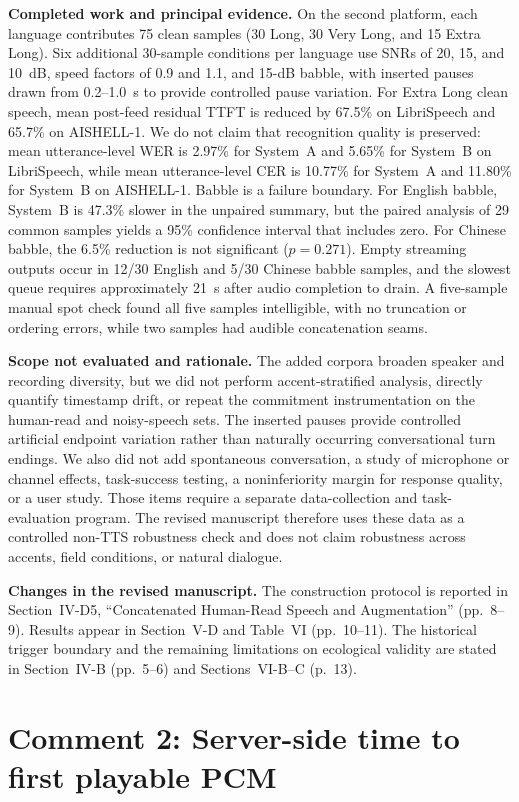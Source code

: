 \documentclass[11pt]{article}
\newcommand{\completed}{\vspace{0.25em}\noindent\textbf{Completed work and principal evidence.} }
\newcommand{\scope}{\vspace{0.25em}\noindent\textbf{Scope not evaluated and rationale.} }
\newcommand{\changes}{\vspace{0.25em}\noindent\textbf{Changes in the revised manuscript.} }
\begin{document}
\completed On the second platform, each language contributes 75 clean samples (30 Long, 30 Very Long, and 15 Extra Long). Six additional 30-sample conditions per language use SNRs of 20, 15, and 10~dB, speed factors of 0.9 and 1.1, and 15-dB babble, with inserted pauses drawn from 0.2--1.0~s to provide controlled pause variation. For Extra Long clean speech, mean post-feed residual TTFT is reduced by 67.5\% on LibriSpeech and 65.7\% on AISHELL-1. We do not claim that recognition quality is preserved: mean utterance-level WER is 2.97\% for System~A and 5.65\% for System~B on LibriSpeech, while mean utterance-level CER is 10.77\% for System~A and 11.80\% for System~B on AISHELL-1. Babble is a failure boundary. For English babble, System~B is 47.3\% slower in the unpaired summary, but the paired analysis of 29 common samples yields a 95\% confidence interval that includes zero. For Chinese babble, the 6.5\% reduction is not significant ($p=0.271$). Empty streaming outputs occur in 12/30 English and 5/30 Chinese babble samples, and the slowest queue requires approximately 21~s after audio completion to drain. A five-sample manual spot check found all five samples intelligible, with no truncation or ordering errors, while two samples had audible concatenation seams.

\scope The added corpora broaden speaker and recording diversity, but we did not perform accent-stratified analysis, directly quantify timestamp drift, or repeat the commitment instrumentation on the human-read and noisy-speech sets. The inserted pauses provide controlled artificial endpoint variation rather than naturally occurring conversational turn endings. We also did not add spontaneous conversation, a study of microphone or channel effects, task-success testing, a noninferiority margin for response quality, or a user study. Those items require a separate data-collection and task-evaluation program. The revised manuscript therefore uses these data as a controlled non-TTS robustness check and does not claim robustness across accents, field conditions, or natural dialogue.

\changes The construction protocol is reported in Section~IV-D5, ``Concatenated Human-Read Speech and Augmentation'' (pp.~8--9). Results appear in Section~V-D and Table~VI (pp.~10--11). The historical trigger boundary and the remaining limitations on ecological validity are stated in Section~IV-B (pp.~5--6) and Sections~VI-B--C (p.~13).

\section*{Comment 2: Server-side time to first playable PCM}
\end{document}
